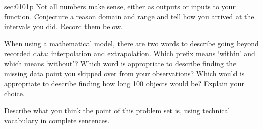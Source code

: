 \begin{multicols*}{2}
\begin{exercises}{sec:0101p}
\vspace{3cm}
\lab{} Not all numbers make sense, either as outputs or inputs to your function.  Conjecture
a reason \gls{domain} and \gls{range} and tell how you arrived at the intervals you did.
Record them below.

\vspace{3cm}
\lab{} When using a \gls{mathematical model}, there are two words to describe going beyond
recorded data:  \gls{interpolation} and \gls{extrapolation}.  
Which prefix means `within' and which means
`without'?  Which word is appropriate to describe finding the missing data point you skipped over from
your observations?  Which would is appropriate to describe finding how long 100 objects 
would be?  Explain your choice.

\vspace{4cm}
\lab{} Describe what you think the point of this problem set is, using technical vocabulary in complete
sentences.
\end{exercises}
\end{multicols*}
